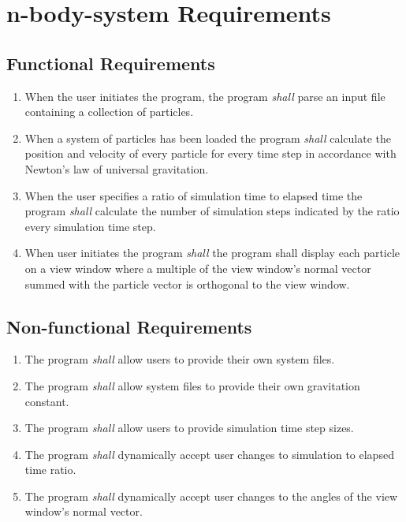 \documentclass[12pt]{article}
\begin{document}
\section*{n-body-system Requirements}
	\subsection*{Functional Requirements}
		\begin{enumerate}[label=FR-\arabic*]
			\item \label{FR.Initiate} When the user initiates the program, the program {\em shall} parse an input file containing a collection of particles.
			\item \label{FR.Calculate} When a system of particles has been loaded the program {\em shall} calculate the position and velocity of every particle for every time step in accordance with Newton's law of universal gravitation.
			\item \label{FR.TimeAccelerate} When the user specifies a ratio of simulation time to elapsed time the program {\em shall} calculate the number of simulation steps indicated by the ratio every simulation time step.
			\item \label{FR.ViewWindow} When user initiates the program {\em shall} the program shall display each particle on a view window where a multiple of the view window's normal vector summed with the particle vector is orthogonal to the view window.
		\end{enumerate}
	\subsection*{Non-functional Requirements}
		\begin{enumerate}[label=NR-\arabic*]
			\item \label{NF.UsersProvideFile} The program {\em shall} allow users to provide their own system files. 
			\item \label{NF.SystemsProvideG} The program {\em shall} allow system files to provide their own gravitation constant. 
			\item \label{NF.UsersProvideTime} The program  {\em shall} allow users to provide simulation time step sizes. 
			\item \label{NF.DynamicTimeAccelerate} The program {\em shall} dynamically accept user changes to simulation to elapsed time ratio.
			\item \label{NF.FR.DynamicViewWindow} The program {\em shall} dynamically accept user changes to the angles of the view window's normal vector. 
		\end{enumerate}
\end{document}
